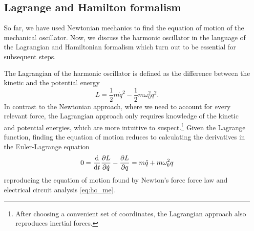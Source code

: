 \subsection{Lagrange and Hamilton formalism}

So far, we have used Newtonian mechanics to find the equation of motion of the mechanical oscillator.
Now, we discuss the harmonic oscillator in the language of the Lagrangian and Hamiltonian formalism which turn out to be essential for subsequent steps.

The Lagrangian of the harmonic oscillator is defined as the difference between the kinetic and the potential energy
\begin{equation}
    L
    =
    \frac{1}{2}m\dot{q}^2
    -
    \frac{1}{2}m\omega_0^2q^2
    \label{eq:ho_lagrangian}.
\end{equation}
In contrast to the Newtonian approach, where we need to account for every relevant force, the Lagrangian approach only requires knowledge of the kinetic and potential energies, which are more intuitive to suspect.\footnote{After choosing a convenient set of coordinates, the Lagrangian approach also reproduces inertial forces.}
Given the Lagrange function, finding the equation of motion reduces to calculating the derivatives in the Euler-Lagrange equation
\begin{equation}
    0
    =
    \dv{t}\pdv{L}{\dot{q}}
    -
    \pdv{L}{q}
    =
    m\ddot{q}+m\omega_0^2q
    \label{eq:ho_euler_lagrange}
\end{equation}
reproducing the equation of motion found by Newton's force force law and electrical circuit analysis \cref{eq:ho_me}.

